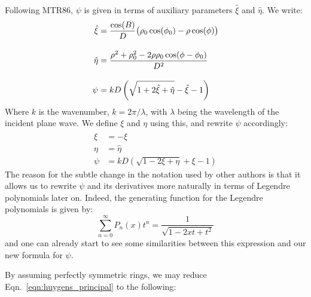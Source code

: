 \documentclass{article}
\theoremstyle{plain}
\begin{document}
        Following MTR86, $\psi$ is given in terms of auxiliary parameters
        $\hat{\xi}$ and $\hat{\eta}$. We write:
        \begin{align}
            \hat{\xi}
            &=\frac{\cos(B)}{D}\big(
                \rho_{0}\cos(\phi_{0})-\rho\cos(\phi)
            \big)\\[1em]
            \hat{\eta}
            &=\frac{%
                \rho^{2}+\rho_{0}^{2}-2\rho\rho_{0}\cos(\phi-\phi_{0})%
            }{D^{2}}\\[1em]
            \psi
            &=kD\left(
                \sqrt{1+2\hat{\xi}+\hat{\eta}}-\hat{\xi}-1
            \right)
        \end{align}
        Where $k$ is the wavenumber, $k=2\pi/\lambda$, with $\lambda$ being
        the wavelength of the incident plane wave.
        We define $\xi$ and $\eta$ using this, and rewrite $\psi$ accordingly:
        \begin{align}
            \xi&=-\hat{\xi}\\
            \eta&=\hat{\eta}\\
            \label{eqn:fresnel_kernel_psi}
            \psi&=kD\left(
                \sqrt{1-2\xi+\eta}+\xi-1
            \right)
        \end{align}
        The reason for the subtle change in the notation used by other
        authors is that it allows us to rewrite $\psi$ and its derivatives
        more naturally in terms of Legendre polynomials later on. Indeed,
        the generating function for the Legendre polynomials is given by:
        \begin{equation}
            \sum_{n=0}^{\infty}P_{n}(x)t^{n}
            =\frac{1}{\sqrt{1-2xt+t^{2}}}
        \end{equation}
        and one can already start to see some similarities between this
        expression and our new formula for $\psi$.
        \par\hfill\par
        By assuming perfectly symmetric rings, we may reduce
        Eqn.~\ref{eqn:huygens_principal} to the following:
\end{document}
